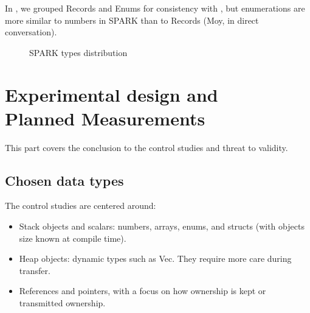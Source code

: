 \documentclass[nomenclature, english, bibtex]{kththesis}
\begin{document}
In , we grouped Records and Enums for consistency with  , but enumerations are more similar to numbers in SPARK than to Records (Moy, in direct conversation).


\begin{figure}[ht!]
  \centering
  \caption{SPARK types distribution}
  \label{fig:repartition_spark}
\end{figure}
\FloatBarrier



\section[Experimental design/Planned Measurements]{Experimental design and\\Planned Measurements}
\label{sec:experimentalDesign}

This part covers the conclusion to the control studies and threat to validity.
\subsection{Chosen data types}
The control studies are centered around:
\begin{itemize}
    \item Stack objects and scalars: numbers, arrays, enums, and structs (with objects size known at compile time).
    \item Heap objects: dynamic types such as Vec. They require more care during transfer.
    \item References and pointers, with a focus on how ownership is kept or transmitted ownership.
\end{itemize}
\end{document}
